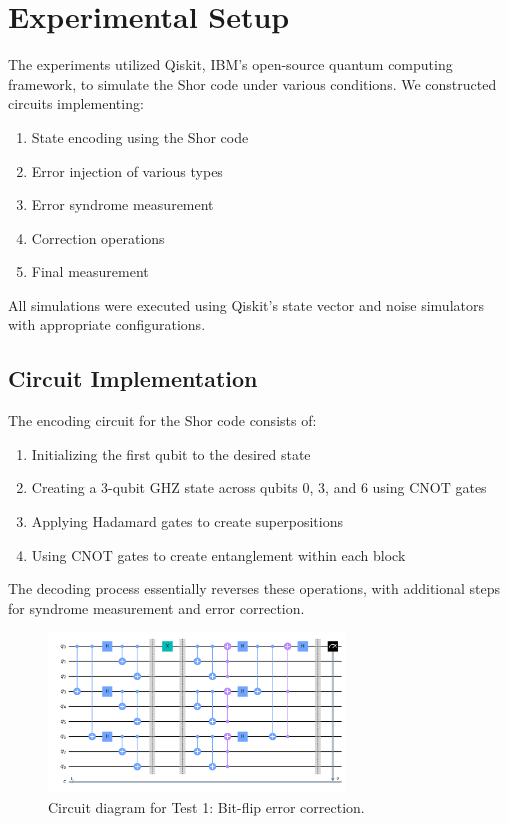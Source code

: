 \documentclass[12pt,a4paper]{article}
\begin{document}
\section{Experimental Setup}

The experiments utilized Qiskit, IBM's open-source quantum computing framework, to simulate the Shor code under various conditions. We constructed circuits implementing:

\begin{enumerate}
    \item State encoding using the Shor code
    \item Error injection of various types
    \item Error syndrome measurement
    \item Correction operations
    \item Final measurement
\end{enumerate}

All simulations were executed using Qiskit's state vector and noise simulators with appropriate configurations.

\subsection{Circuit Implementation}

The encoding circuit for the Shor code consists of:

\begin{enumerate}
    \item Initializing the first qubit to the desired state
    \item Creating a 3-qubit GHZ state across qubits 0, 3, and 6 using CNOT gates
    \item Applying Hadamard gates to create superpositions
    \item Using CNOT gates to create entanglement within each block
\end{enumerate}

The decoding process essentially reverses these operations, with additional steps for syndrome measurement and error correction.

\begin{figure}[H]
    \centering
    \includegraphics[width=0.7\textwidth]{images/test1_bit_flip_correction.png}
    \caption{Circuit diagram for Test 1: Bit-flip error correction.}
    \label{fig:bit_flip_circuit}
\end{figure}
\end{document}
